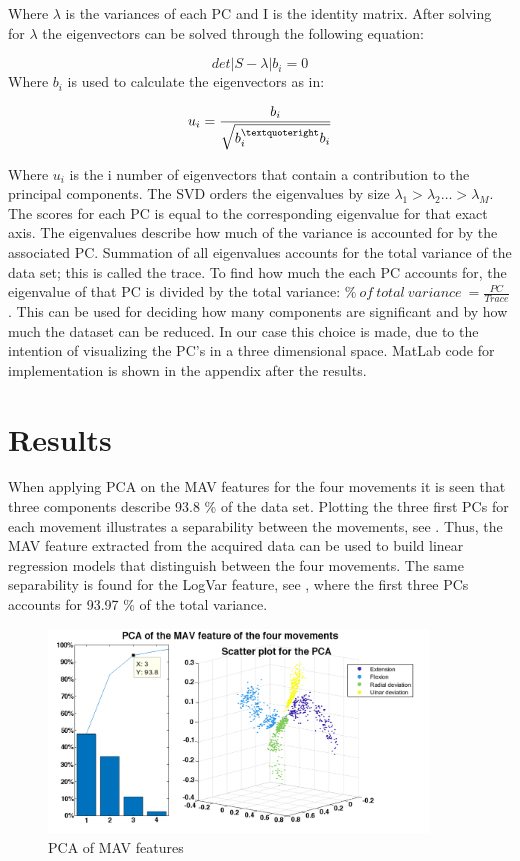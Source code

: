 Where $\lambda$ is the variances of each PC and I is the identity matrix. After solving for $\lambda$ the eigenvectors can be solved through the following equation:

\begin{equation}
det | S - \lambda | b_{i} = 0
\end{equation}
Where $b_{i}$ is used to calculate the eigenvectors as in:

\begin{eqnarray}
u_{i} = \frac{b_{i}}{\sqrt{b_{i}^{\textquoteright} b_{i}}}
\end{eqnarray}

Where $u_{i}$ is the i number of eigenvectors that contain a contribution to the principal components.
The SVD orders the eigenvalues by size $\lambda_{1} > \lambda_{2} … > \lambda_{M}$. The scores for each PC is equal to the corresponding eigenvalue for that exact axis. The eigenvalues describe how much of the variance is accounted for by the associated PC. Summation of all eigenvalues accounts for the total variance of the data set; this is called the trace. To find how much the each PC accounts for, the eigenvalue of that PC is divided by the total variance: $\%~ of~ total~ variance~ = \frac{PC}{Trace}$. This can be used for deciding how many components are significant and by how much the dataset can be reduced. In our case this choice is made, due to the intention of visualizing the PC’s in a three dimensional space. 
MatLab code for implementation is shown in the appendix after the results.

\section*{Results}

When applying PCA on the MAV features for the four movements it is seen that three components describe 93.8 \% of the data set. Plotting the three first PCs for each movement illustrates a separability between the movements, see . Thus, the MAV feature extracted from the acquired data can be used to build linear regression models that distinguish between the four movements. The same separability is found for the LogVar feature, see , where the first three PCs accounts for 93.97 \% of the total variance. 

\begin{figure}[H] 
	\includegraphics[width=0.9\textwidth]{figures/zASP/pcasubplotMAV}
	\caption{PCA of MAV features}
	\label{PCAMAV}
\end{figure}

